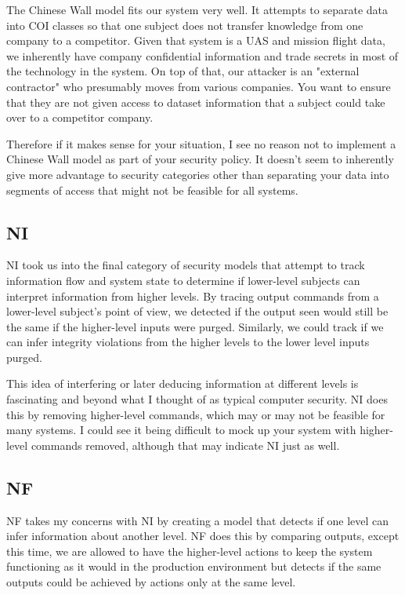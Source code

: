 \documentclass[10pt,journal,compsoc]{IEEEtran}
\begin{document}
The Chinese Wall model fits our system very well. It attempts to separate data into COI classes so that one subject does not transfer knowledge from one company to a competitor. Given that system is a UAS and mission flight data, we inherently have company confidential information and trade secrets in most of the technology in the system. On top of that, our attacker is an "external contractor" who presumably moves from various companies. You want to ensure that they are not given access to dataset information that a subject could take over to a competitor company. 

Therefore if it makes sense for your situation, I see no reason not to implement a Chinese Wall model as part of your security policy. It doesn't seem to inherently give more advantage to security categories other than separating your data into segments of access that might not be feasible for all systems. 

\subsection{NI}

NI took us into the final category of security models that attempt to track information flow and system state to determine if lower-level subjects can interpret information from higher levels. By tracing output commands from a lower-level subject's point of view, we detected if the output seen would still be the same if the higher-level inputs were purged. Similarly, we could track if we can infer integrity violations from the higher levels to the lower level inputs purged. 

This idea of interfering or later deducing information at different levels is fascinating and beyond what I thought of as typical computer security. NI does this by removing higher-level commands, which may or may not be feasible for many systems. I could see it being difficult to mock up your system with higher-level commands removed, although that may indicate NI just as well.

\subsection{NF}

NF takes my concerns with NI by creating a model that detects if one level can infer information about another level. NF does this by comparing outputs, except this time, we are allowed to have the higher-level actions to keep the system functioning as it would in the production environment but detects if the same outputs could be achieved by actions only at the same level. 
\end{document}
